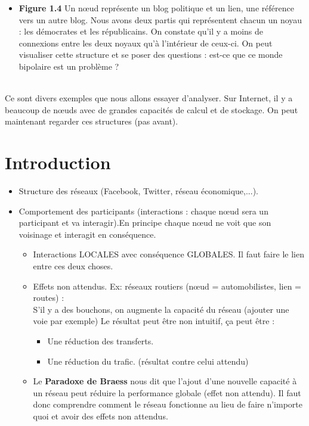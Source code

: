 \begin{itemize}
	\item \textbf{Figure 1.4} Un nœud représente un blog politique et un lien, une référence vers un autre blog. Nous avons deux partis qui représentent chacun un noyau : les démocrates et les républicains. On constate qu'il y a moins de connexions entre les deux noyaux qu'à l'intérieur de ceux-ci. On peut visualiser cette structure et se poser des questions : est-ce que ce monde bipolaire est un problème ?\\\
\end{itemize}

Ce sont divers exemples que nous allons essayer d'analyser. Sur Internet, il y a beaucoup de nœuds avec de grandes capacités de calcul et de stockage. On peut maintenant regarder ces structures (pas avant). 
\section{Introduction}
\begin{itemize}
\item Structure des réseaux (Facebook, Twitter, réseau économique,...).
\item Comportement des participants (interactions : chaque nœud sera un participant et va interagir).En principe chaque nœud ne voit que son voisinage et interagit en conséquence.
\begin{itemize}


	\item Interactions LOCALES avec conséquence GLOBALES.
	Il faut faire le lien entre ces deux choses.
	\item Effets non attendus. Ex: réseaux routiers (nœud = automobilistes, lien = routes) : \\
	S'il y a des bouchons, on augmente la capacité du réseau (ajouter une voie par exemple)
	Le résultat peut être non intuitif, ça peut être :
	\begin{itemize} 
		\item Une réduction des transferts.
		\item Une réduction du trafic. (résultat contre celui attendu)
	\end{itemize}	
	\item Le \textbf{Paradoxe de Braess} nous dit que l'ajout d'une nouvelle capacité à un réseau peut 	réduire la performance globale (effet non attendu).
Il faut donc comprendre comment le réseau fonctionne au lieu de faire n'importe quoi et avoir des effets non attendus.
\end{itemize}
\end{itemize}
